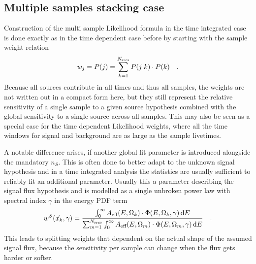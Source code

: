 \subsection{Multiple samples stacking case}
Construction of the multi sample Likelihood formula in the time integrated case is done exactly as in the time dependent case before by starting with the sample weight relation
\begin{equation}
  w_j = P(j) = \sum_{k=1}^{N_\text{srcs}} P(j|k)\cdot P(k)
  \quad\text{.}
\end{equation}
Because all sources contribute in all times and thus all samples, the weights are not written out in a compact form here, but they still represent the relative sensitivity of a single sample to a given source hypothesis combined with the global sensitivity to a single source across all samples.
This may also be seen as a special case for the time dependent Likelihood weights, where all the time windows for signal and background are as large as the sample livetimes.

A notable difference arises, if another global fit parameter is introduced alongside the mandatory $n_S$.
This is often done to better adapt to the unknown signal hypothesis and in a time integrated analysis the statistics are usually sufficient to reliably fit an additional parameter.
Usually this a parameter describing the signal flux hypothesis and is modelled as a single unbroken power law with spectral index $\gamma$ in the energy PDF term
\begin{equation}
  w^S(\vec{x}_k, \gamma)
  = \frac
      {
        \int_0^\infty A_\text{eff}(E,\Omega_k)\cdot
          \Phi(E, \Omega_k, \gamma)\,\mathrm{d}E
      }
      {
        \sum_{m=1}^{N_\text{srcs}}
        \int_0^\infty A_\text{eff}(E,\Omega_m)\cdot
          \Phi(E, \Omega_m, \gamma)\,\mathrm{d}E
      }
  \quad\text{.}
\end{equation}
This leads to splitting weights that dependent on the actual shape of the assumed signal flux, because the sensitivity per sample can change when the flux gets harder or softer.

